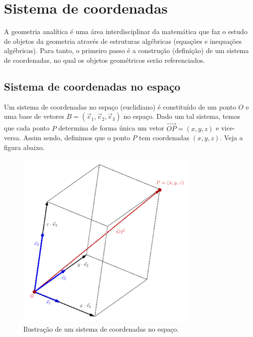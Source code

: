 
\chapter{Sistema de coordenadas}\label{cap_scoord}
\thispagestyle{fancy}

A geometria analítica é uma área interdisciplinar da matemática que faz o estudo de objetos da geometria através de estruturas algébricas (equações e inequações algébricas). Para tanto, o primeiro passo é a construção (definição) de um sistema de coordenadas, no qual os objetos geométricos serão referenciados.

\section{Sistema de coordenadas no espaço}\label{cap_scoord_sec_scoord}

Um sistema de coordenadas no espaço (euclidiano) é constituído de um ponto $O$ e uma base de vetores $B = (\vec{e}_1, \vec{e}_2, \vec{e}_3)$ no espaço. Dado um tal sistema, temos que cada ponto $P$ determina de forma única um vetor $\overrightarrow{OP} = (x,y,z)$ e vice-versa. Assim sendo, definimos que o ponto $P$ tem coordenadas $(x,y,z)$. Veja a figura abaixo.

\begin{figure}[H]
  \centering
  \includegraphics[width=0.8\textwidth]{cap_scoord/dados/fig_scoord/fig}
  \caption{Ilustração de um sistema de coordenadas no espaço.}
  \label{fig:scoord}
\end{figure}

